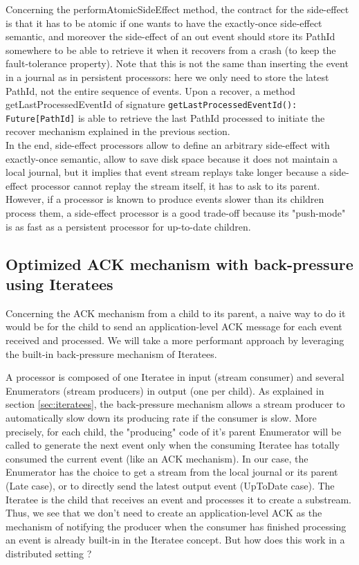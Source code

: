 Concerning the performAtomicSideEffect method, the contract for the side-effect is that it has to be atomic if one wants to have the exactly-once side-effect semantic, and moreover the side-effect of an out event should store its PathId somewhere to be able to retrieve it when it recovers from a crash (to keep the fault-tolerance property). Note that this is not the same than inserting the event in a journal as in persistent processors: here we only need to store the latest PathId, not the entire sequence of events. Upon a recover, a method getLastProcessedEventId of signature \verb|getLastProcessedEventId(): Future[PathId]| is able to retrieve the last PathId processed to initiate the recover mechanism explained in the previous section.
\\

In the end, side-effect processors allow to define an arbitrary side-effect with exactly-once semantic, allow to save disk space because it does not maintain
a local journal, but it implies that event stream replays take longer because a side-effect processor cannot replay the stream itself, it has to ask to its parent. However, if a processor is known to produce events slower than its children process them, a side-effect processor is a good trade-off because its "push-mode" is as fast as a persistent processor for up-to-date children.


\subsection{Optimized ACK mechanism with back-pressure using Iteratees}

Concerning the ACK mechanism from a child to its parent, a naive way to do it would be for the child to send an application-level ACK message for each event received and processed. We will take a more performant approach by leveraging the built-in back-pressure mechanism of Iteratees. 

A processor is composed of one Iteratee in input (stream consumer) and several Enumerators (stream producers) in output (one per child). As explained in section \ref{sec:iteratees}, the back-pressure mechanism allows a stream producer to automatically slow down its producing rate if the consumer is slow. 
More precisely, for each child, the "producing" code of it's parent Enumerator will be called to generate the next event only when the consuming Iteratee has totally consumed the current event (like an ACK mechanism). In our case, the Enumerator has the choice to get a stream from the local journal or its parent (Late case), or to directly send the latest output event (UpToDate case).
The Iteratee is the child that receives an event and processes it to create a substream.
Thus, we see that we don't need to create an application-level ACK as the mechanism of notifying the producer when the consumer has finished processing an event is already
built-in in the Iteratee concept. But how does this work in a distributed setting ?


